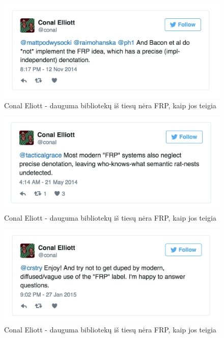 \documentclass{VUMIFPSmagistrinis}
\begin{document}
\begin{figure}[H]
    \centering
    \includegraphics[scale=0.5]{img/not_frp4}
    \caption{Conal Eliott - dauguma bibliotekų iš tiesų nėra FRP, kaip jos teigia}
    \label{img:not_frp4}
\end{figure}

\begin{figure}[H]
    \centering
    \includegraphics[scale=0.5]{img/not_frp5}
    \caption{Conal Eliott - dauguma bibliotekų iš tiesų nėra FRP, kaip jos teigia}
    \label{img:not_frp5}
\end{figure}

\begin{figure}[H]
    \centering
    \includegraphics[scale=0.5]{img/not_frp6}
    \caption{Conal Eliott - dauguma bibliotekų iš tiesų nėra FRP, kaip jos teigia}
    \label{img:not_frp6}
\end{figure}
\end{document}

